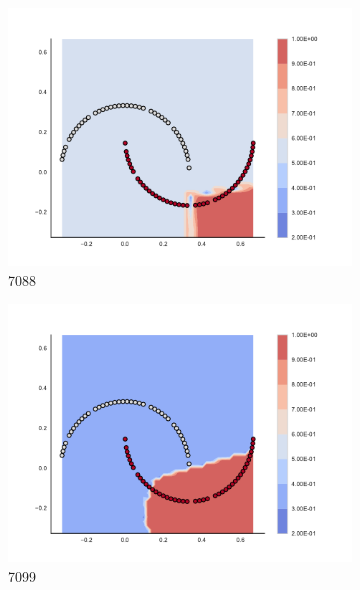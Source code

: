 \begin{figure}[h]
\begin{subfigure}[b]{0.09\textwidth}
    \includegraphics[clip, trim=2.35cm 1.75cm 4.5cm 0cm,width=\textwidth]{img/convergence/7088.pdf}
    \caption{7088}
    \label{fig:convergence_7088}
\end{subfigure}
%
\begin{subfigure}[b]{0.09\textwidth}
    \includegraphics[clip, trim=2.35cm 1.75cm 4.5cm 0cm,width=\textwidth]{img/convergence/7099.pdf}
    \caption{7099}
    \label{fig:convergence_7099}
\end{subfigure}
%
\begin{subfigure}[b]{0.09\textwidth}

\end{subfigure}
\end{figure}
